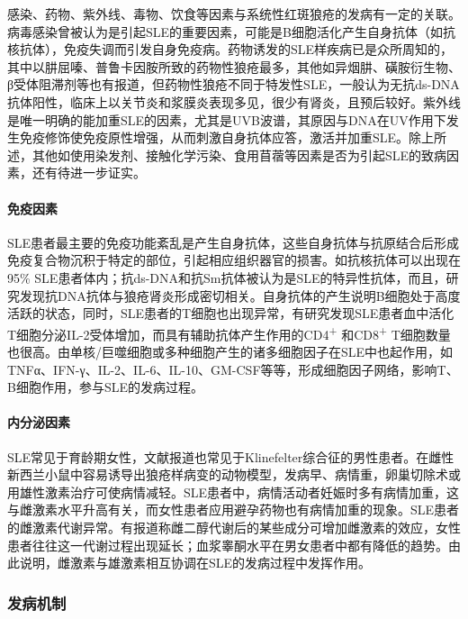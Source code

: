 感染、药物、紫外线、毒物、饮食等因素与系统性红斑狼疮的发病有一定的关联。病毒感染曾被认为是引起SLE的重要因素，可能是B细胞活化产生自身抗体（如抗核抗体），免疫失调而引发自身免疫病。药物诱发的SLE样疾病已是众所周知的，其中以肼屈嗪、普鲁卡因胺所致的药物性狼疮最多，其他如异烟肼、磺胺衍生物、β受体阻滞剂等也有报道，但药物性狼疮不同于特发性SLE，一般认为无抗ds-DNA抗体阳性，临床上以关节炎和浆膜炎表现多见，很少有肾炎，且预后较好。紫外线是唯一明确的能加重SLE的因素，尤其是UVB波谱，其原因与DNA在UV作用下发生免疫修饰使免疫原性增强，从而刺激自身抗体应答，激活并加重SLE。除上所述，其他如使用染发剂、接触化学污染、食用苜蓿等因素是否为引起SLE的致病因素，还有待进一步证实。

\paragraph{免疫因素}

SLE患者最主要的免疫功能紊乱是产生自身抗体，这些自身抗体与抗原结合后形成免疫复合物沉积于特定的部位，引起相应组织器官的损害。如抗核抗体可以出现在95\%
SLE患者体内；抗ds-DNA和抗Sm抗体被认为是SLE的特异性抗体，而且，研究发现抗DNA抗体与狼疮肾炎形成密切相关。自身抗体的产生说明B细胞处于高度活跃的状态，同时，SLE患者的T细胞也出现异常，有研究发现SLE患者血中活化T细胞分泌IL-2受体增加，而具有辅助抗体产生作用的CD4\textsuperscript{+}
和CD8\textsuperscript{+}
T细胞数量也很高。由单核/巨噬细胞或多种细胞产生的诸多细胞因子在SLE中也起作用，如TNFα、IFN-γ、IL-2、IL-6、IL-10、GM-CSF等等，形成细胞因子网络，影响T、B细胞作用，参与SLE的发病过程。

\paragraph{内分泌因素}

SLE常见于育龄期女性，文献报道也常见于Klinefelter综合征的男性患者。在雌性新西兰小鼠中容易诱导出狼疮样病变的动物模型，发病早、病情重，卵巢切除术或用雄性激素治疗可使病情减轻。SLE患者中，病情活动者妊娠时多有病情加重，这与雌激素水平升高有关，而女性患者应用避孕药物也有病情加重的现象。SLE患者的雌激素代谢异常。有报道称雌二醇代谢后的某些成分可增加雌激素的效应，女性患者往往这一代谢过程出现延长；血浆睾酮水平在男女患者中都有降低的趋势。由此说明，雌激素与雄激素相互协调在SLE的发病过程中发挥作用。

\subsubsection{发病机制}

